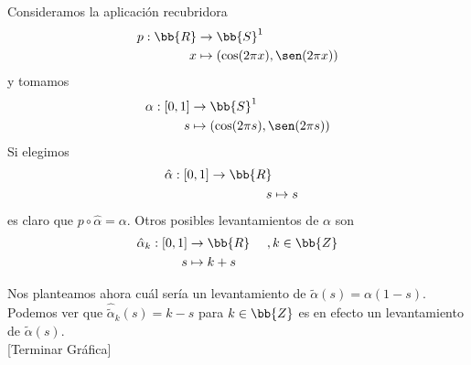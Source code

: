 \begin{ejemplo}
    Consideramos la aplicación recubridora
    \begin{align*}
        p:\bb{R} & \to \bb{S}^1\\
        x & \mapsto (\cos(2\pi x), \sen(2\pi x))
    \end{align*}
    y tomamos
    \begin{align*}
        \alpha: [0,1] & \to \bb{S}^1\\
        s & \mapsto (\cos(2\pi s), \sen(2\pi s))
    \end{align*}
    Si elegimos
    \begin{align*}
        \hat{\alpha} : [0,1] \to \bb{R}\\
        s & \mapsto s
    \end{align*}
    es claro que $p\circ \hat{\alpha} = \alpha$. Otros posibles levantamientos de $\alpha$ son 
    \begin{align*}
        \hat{\alpha}_k : [0,1] & \to \bb{R}\ \ \ \ , k\in \bb{Z}  \\
        s & \mapsto k+s
    \end{align*}
    
    Nos planteamos ahora cuál sería un levantamiento de $\tilde{\alpha}(s) = \alpha(1-s)$. Podemos ver que $\hat{\tilde{\alpha}}_k(s) = k-s$ para $k\in \bb{Z}$ es en efecto un levantamiento de $\tilde{\alpha}(s)$.\\

    [Terminar Gráfica]

    \begin{figure}[H]
        \centering
\end{figure}
\end{ejemplo}

